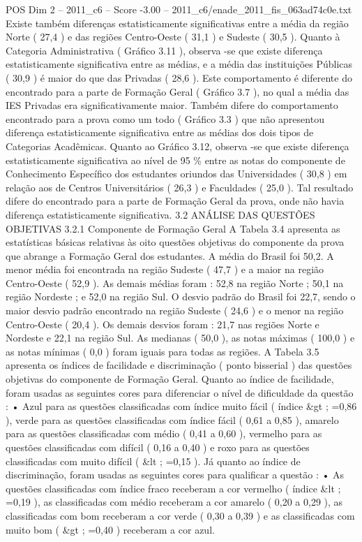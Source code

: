 \begin{textsample}{POS Dim 2 – 2011\_c6 – Score -3.00 – 2011\_c6/enade\_2011\_fis\_063ad74c0e.txt}
Existe também diferenças estatisticamente significativas entre a média da região Norte ( 27,4 ) e das regiões Centro-Oeste ( 31,1 ) e Sudeste ( 30,5 ).
Quanto à Categoria Administrativa ( Gráfico 3.11 ), observa -se que existe diferença estatisticamente significativa entre as médias, e a média das instituições Públicas ( 30,9 ) é maior do que das Privadas ( 28,6 ).
Este comportamento é diferente do encontrado para a parte de Formação Geral ( Gráfico 3.7 ), no qual a média das IES Privadas era significativamente maior.
Também difere do comportamento encontrado para a prova como um todo ( Gráfico 3.3 ) que não apresentou diferença estatisticamente significativa entre as médias dos dois tipos de Categorias Acadêmicas.
Quanto ao Gráfico 3.12, observa -se que existe diferença estatisticamente significativa ao nível de 95 \% entre as notas do componente de Conhecimento Específico dos estudantes oriundos das Universidades ( 30,8 ) em relação aos de Centros Universitários ( 26,3 ) e Faculdades ( 25,0 ).
Tal resultado difere do encontrado para a parte de Formação Geral da prova, onde não havia diferença estatisticamente significativa. 3.2 ANÁLISE DAS QUESTÕES OBJETIVAS 3.2.1 Componente de Formação Geral A Tabela 3.4 apresenta as estatísticas básicas relativas às oito questões objetivas do componente da prova que abrange a Formação Geral dos estudantes.
A média do Brasil foi 50,2.
A menor média foi encontrada na região Sudeste ( 47,7 ) e a maior na região Centro-Oeste ( 52,9 ).
As demais médias foram : 52,8 na região Norte ; 50,1 na região Nordeste ; e 52,0 na região Sul.
O desvio padrão do Brasil foi 22,7, sendo o maior desvio padrão encontrado na região Sudeste ( 24,6 ) e o menor na região Centro-Oeste ( 20,4 ).
Os demais desvios foram : 21,7 nas regiões Norte e Nordeste e 22,1 na região Sul.
As medianas ( 50,0 ), as notas máximas ( 100,0 ) e as notas mínimas ( 0,0 ) foram iguais para todas as regiões.
A Tabela 3.5 apresenta os índices de facilidade e discriminação ( ponto bisserial ) das questões objetivas do componente de Formação Geral.
Quanto ao índice de facilidade, foram usadas as seguintes cores para diferenciar o nível de dificuldade da questão : • Azul para as questões classificadas com índice muito fácil ( índice \&gt ; =0,86 ), verde para as questões classificadas com índice fácil ( 0,61 a 0,85 ), amarelo para as questões classificadas com médio ( 0,41 a 0,60 ), vermelho para as questões classificadas com difícil ( 0,16 a 0,40 ) e roxo para as questões classificadas com muito difícil ( \&lt ; =0,15 ).
Já quanto ao índice de discriminação, foram usadas as seguintes cores para qualificar a questão : • As questões classificadas com índice fraco receberam a cor vermelho ( índice \&lt ; =0,19 ), as classificadas com médio receberam a cor amarelo ( 0,20 a 0,29 ), as classificadas com bom receberam a cor verde ( 0,30 a 0,39 ) e as classificadas com muito bom ( \&gt ; =0,40 ) receberam a cor azul.

\end{textsample}
